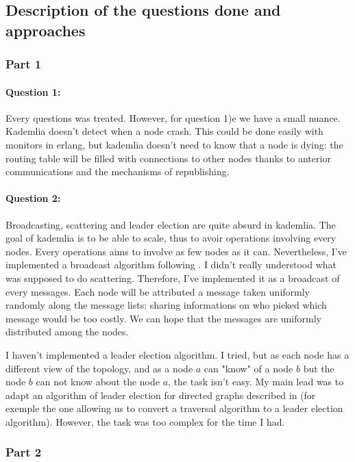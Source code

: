 \documentclass[a4paper]{article}
\begin{document}
\subsection{Description of the questions done and approaches}

\subsubsection{Part 1}

\paragraph{Question 1:} Every questions was treated. However, for question 1)e we have a small nuance. Kademlia doesn't detect when a node crash. This could be done easily with monitors in erlang, but kademlia doesn't need to know that a node is dying: the routing table will be filled with connections to other nodes thanks to anterior communications and the mechanisms of republishing.

\paragraph{Question 2:} 
Broadcasting, scattering and leader election are quite absurd in kademlia. The goal of kademlia is to be able to scale, thus to avoir operations involving every nodes. Every operations aims to involve as few nodes as it can. Nevertheless, I've implemented a broadcast algorithm following \cite{czirkos2013solution}. I didn't really understood what was supposed to do scattering. Therefore, I've implemented it as a broadcast of every messages. Each node will be attributed a message taken uniformly randomly along the message lists: sharing informations on who picked which message would be too costly. We can hope that the messages are uniformly distributed among the nodes.

I haven't implemented a leader election algorithm. I tried, but as each node has a different view of the topology, and as a node $a$ can "know" of a node $b$ but the node $b$ can not know about the node $a$, the task isn't easy. My main lead was to adapt an algorithm of leader election for directed graphs described in \cite{tel2000introduction} (for exemple the one allowing us to convert a traversal algorithm to a leader election algorithm). However, the task was too complex for the time I had.


\subsubsection{Part 2}
\end{document}
